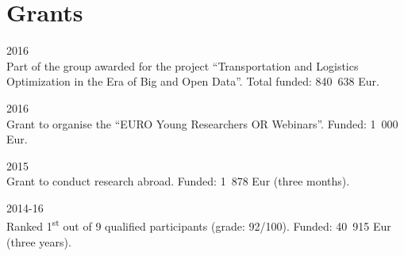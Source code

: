 \section*{Grants}

\begin{paracol}{2}
  \textsc{2016}
\switchcolumn
  \\
  Part of the group awarded for the project ``Transportation and Logistics Optimization in the Era of Big and Open Data''. Total funded: 840~638 Eur.
\end{paracol}

\begin{paracol}{2}
  \textsc{2016}
\switchcolumn
  \\
  Grant to organise the ``EURO Young Researchers OR Webinars''. Funded: 1~000 Eur.
\end{paracol}

\begin{paracol}{2}
  \textsc{2015}
\switchcolumn
  \\
  Grant to conduct research abroad. Funded: 1~878 Eur (three months).
\end{paracol}

\begin{paracol}{2}
  \textsc{2014-16}
\switchcolumn
  \\
  Ranked 1\textsuperscript{st} out of 9 qualified participants (grade: 92/100). Funded: 40~915 Eur (three years).
\end{paracol}
